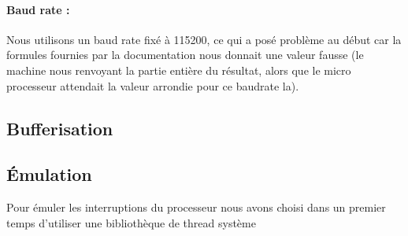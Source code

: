 \paragraph{Baud rate :}
Nous utilisons un baud rate fixé à 115200, ce qui a posé problème au
début car la formules fournies par la documentation nous donnait une
valeur fausse (le machine nous renvoyant la partie entière du
résultat, alors que le micro processeur attendait la valeur arrondie
pour ce baudrate la).

\subsection{Bufferisation}

\subsection{Émulation}
Pour émuler les interruptions du processeur nous avons choisi dans un
premier temps d'utiliser une bibliothèque de thread système
